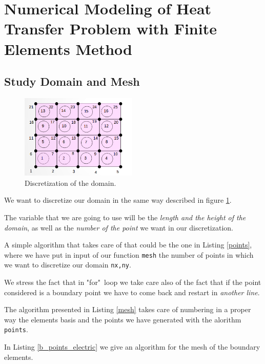 
\section{Numerical Modeling of Heat Transfer Problem with Finite Elements Method}
\subsection{Study Domain and Mesh}
\label{sec:4.1}
\begin{figure}
	\centering
	\includegraphics[height=4cm]{Images/mesh.png}
	\caption{Discretization of the domain.}
	\label{figure:mesh}
\end{figure}
\begin{mdframed}
	We want to discretize our domain in the same way described in figure \ref{figure:mesh}.
	
	The variable that we are going to use will be the \emph{length and the height of the domain}, as well as the \emph{number of the point} we want in our discretization. 
	
	A simple algorithm that takes care of that could be the one in Listing \ref{points}, where we have put in input of our function \texttt{mesh} the number of points in which we want to discretize our domain \texttt{nx,ny}.   
	
	
	
	We stress the fact that in "for"~loop we take care also of the fact that if the point considered is a boundary point we have to come back and restart in \emph{another line}.
	
	The algorithm presented in Listing \ref{mesh} takes care of numbering in a proper way the elements basis and the points we have generated with the alorithm \texttt{points}.
	
	
	In Listing \ref{b_points_electric} we give an algorithm for the mesh of the boundary elements.  
	
\end{mdframed}
